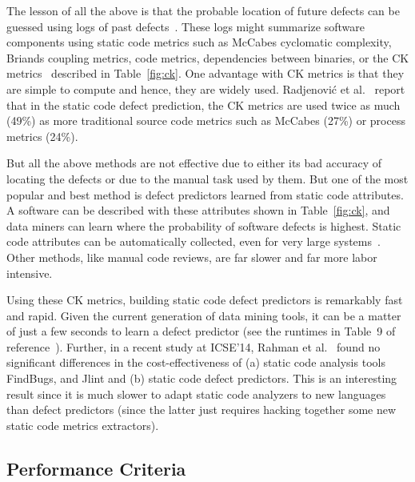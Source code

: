 \documentclass[sigconf,review, anonymous]{acmart}
\theoremstyle{break}
\theoremstyle{break}
\begin{document}
The lesson of all the above  is that the probable location
of future defects can be guessed using   logs of past defects~\cite{hall2012systematic, catal2009systematic}. These logs might
summarize software components using
static code metrics such as 
McCabes  cyclomatic  complexity, Briands coupling metrics, code metrics,  
dependencies between  binaries, or
the  CK  metrics~\cite{chidamber1994metrics} described in  Table~\ref{fig:ck}. 
One advantage with CK metrics is that they are  simple  to  compute and hence,
they are widely used. Radjenovi{\'c} et al.~\cite{radjenovic2013software} report that in
the static code defect prediction, the CK metrics are
used  twice as much (49\%) 
as more traditional source code metrics such as McCabes (27\%) or process metrics (24\%).

But all the above methods are not effective due to either its bad accuracy of locating the defects or due to the manual task used by them. But one of the most  popular and best method is defect predictors learned from static code attributes. A software can be described with these attributes shown in Table~\ref{fig:ck}, and data miners can learn where the
probability of software defects is highest. Static code attributes can be automatically
collected, even for very large systems~\cite{nagappan2005static}. Other methods,
like manual code reviews, are far slower and far more labor intensive. 

Using these CK metrics, building static code defect predictors is remarkably fast and rapid.
Given the current generation of data mining tools, it can be a matter
of just a few seconds to learn a defect predictor (see the runtimes in Table~9 of reference~\cite{fu2016tuning}). Further, in a recent study at ICSE'14, Rahman et
al.~\cite{Rahman14} found no significant differences in the cost-effectiveness
of
(a) static code analysis tools FindBugs, and Jlint and (b) static code defect predictors.
This is an interesting result since it is  much slower to adapt static code
analyzers to new  languages than defect predictors (since the latter just requires hacking together some new
static code metrics extractors).


\subsection{Performance Criteria}
\label{sect:performance}

\end{document}
